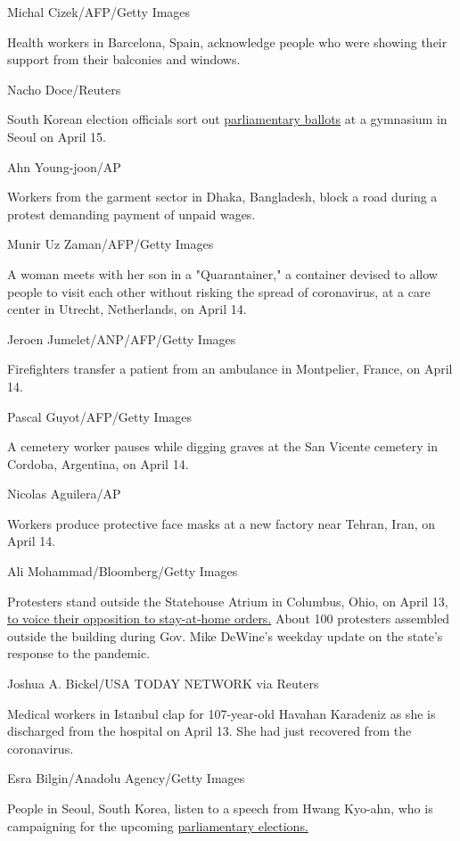 Michal Cizek/AFP/Getty Images

Health workers in Barcelona, Spain, acknowledge people who were showing
their support from their balconies and windows.

Nacho Doce/Reuters

South Korean election officials sort out
\href{https://edition.cnn.com/2020/04/15/asia/south-korea-election-intl-hnk/index.html}{parliamentary
ballots} at a gymnasium in Seoul on April 15.

Ahn Young-joon/AP

Workers from the garment sector in Dhaka, Bangladesh, block a road
during a protest demanding payment of unpaid wages.

Munir Uz Zaman/AFP/Getty Images

A woman meets with her son in a "Quarantainer," a container devised to
allow people to visit each other without risking the spread of
coronavirus, at a care center in Utrecht, Netherlands, on April 14.

Jeroen Jumelet/ANP/AFP/Getty Images

Firefighters transfer a patient from an ambulance in Montpelier, France,
on April 14.

Pascal Guyot/AFP/Getty Images

A cemetery worker pauses while digging graves at the San Vicente
cemetery in Cordoba, Argentina, on April 14.

Nicolas Aguilera/AP

Workers produce protective face masks at a new factory near Tehran,
Iran, on April 14.

Ali Mohammad/Bloomberg/Getty Images

Protesters stand outside the Statehouse Atrium in Columbus, Ohio, on
April 13,
\href{https://www.cnn.com/2020/04/16/us/protests-coronavirus-stay-home-orders/index.html}{to
voice their opposition to stay-at-home orders.} About 100 protesters
assembled outside the building during Gov. Mike DeWine's weekday update
on the state's response to the pandemic.

Joshua A. Bickel/USA TODAY NETWORK via Reuters

Medical workers in Istanbul clap for 107-year-old Havahan Karadeniz as
she is discharged from the hospital on April 13. She had just recovered
from the coronavirus.

Esra Bilgin/Anadolu Agency/Getty Images

People in Seoul, South Korea, listen to a speech from Hwang Kyo-ahn, who
is campaigning for the upcoming
\href{https://edition.cnn.com/2020/04/13/asia/elections-coronavirus-pandemic-intl-hnk/index.html}{parliamentary
elections.}

